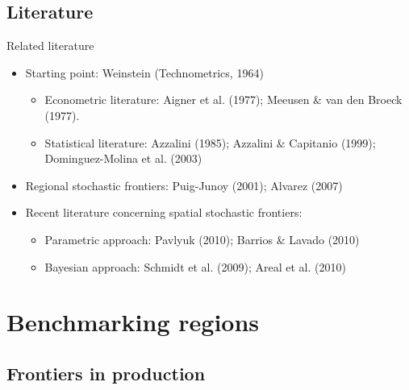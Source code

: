 \documentclass[ignorenonframetext]{beamer}
\begin{document}
\subsection{Literature}

\begin{frame}{Related literature}
	\begin{itemize}
		\item Starting point: Weinstein (Technometrics, 1964)
		\begin{itemize}
			\item Econometric literature: Aigner et al. (1977); Meeusen \& van den Broeck (1977). 
			\item Statistical literature: Azzalini (1985); Azzalini \& Capitanio (1999); Dominguez-Molina et al. (2003)
		\end{itemize}
		\pause
		\item Regional stochastic frontiers: Puig-Junoy (2001); Alvarez (2007)
		\pause
		\item Recent literature concerning spatial stochastic frontiers: 
	\begin{itemize}
		\item Parametric approach: Pavlyuk (2010); Barrios \& Lavado (2010)
		\item Bayesian approach: Schmidt et al. (2009); Areal et al. (2010)
	\end{itemize}
	\end{itemize}
\end{frame} 

\section{Benchmarking regions}

\subsection{Frontiers in production}
\end{document}

